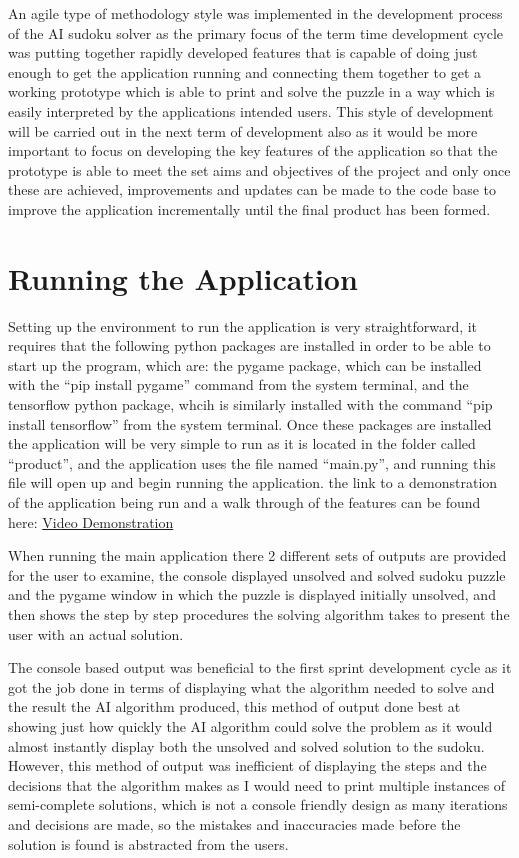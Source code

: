 \documentclass[]{final_report}
\begin{document}
An agile type of methodology style was implemented in the development process of the AI sudoku solver as the primary focus of the term time development cycle was putting together rapidly developed features that is capable of doing just enough to get the application running and connecting them together to get a working prototype which is able to print and solve the puzzle in a way which is easily interpreted by the applications intended users. This style of development will be carried out in the next term of development also as it would be more important to focus on developing the key features of the application so that the prototype is able to meet the set aims and objectives of the project and only once these are achieved, improvements and updates can be made to the code base to improve the application incrementally until the final product has been formed. 

\section{Running the Application}

Setting up the environment to run the application is very straightforward, it requires that the following python packages are installed in order to be able to start up the program, which are: the pygame package, which can be installed with the “pip install pygame” command from the system terminal, and the tensorflow python package, whcih is similarly installed with the command “pip install tensorflow” from the system terminal. Once these packages are installed the application will be very simple to run as it is located in the folder called “product”, and the application uses the file named “main.py”, and running this file will open up and begin running the application. the link to a demonstration of the application being run and a walk through of the features can be found here: \href{https://youtu.be/xUyc8lxhMn4}{Video Demonstration}

When running the main application there 2 different sets of outputs are provided for the user to examine, the console displayed unsolved and solved sudoku puzzle and the pygame window in which the puzzle is displayed initially unsolved, and then shows the step by step procedures the solving algorithm takes to present the user with an actual solution. 

The console based output was beneficial to the first sprint development cycle as it got the job done in terms of displaying what the algorithm needed to solve and the result the AI algorithm produced, this method of output done best at showing just how quickly the AI algorithm could solve the problem as it would almost instantly display both the unsolved and solved solution to the sudoku. However, this method of output was inefficient of displaying the steps and the decisions that the algorithm makes as I would need to print multiple instances of semi-complete solutions, which is not a console friendly design as many iterations and decisions are made, so the mistakes and inaccuracies made before the solution is found is abstracted from the users. 
\end{document}
